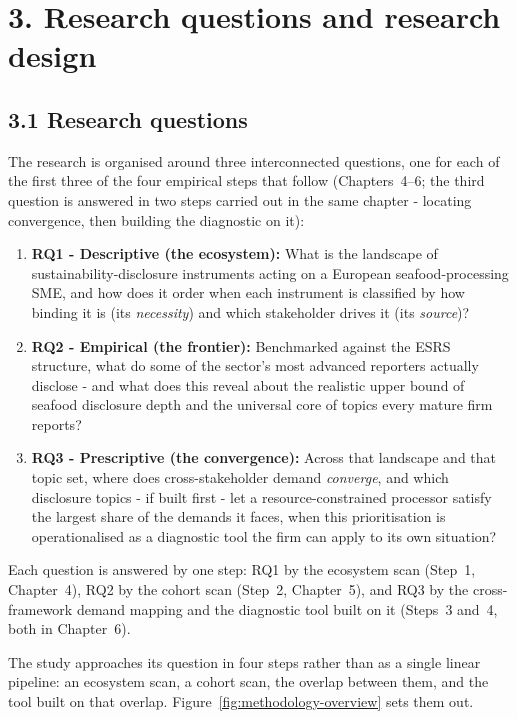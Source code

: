 \documentclass[
]{article}
\begin{document}
\section{3. Research questions and research design}\label{research-questions-and-contribution}

\subsection{3.1 Research questions}\label{research-questions}

The research is organised around three interconnected questions, one for each of
the first three of the four empirical steps that follow (Chapters~4--6; the
third question is answered in two steps carried out in the same chapter - locating convergence, then building the diagnostic on it):

\begin{enumerate}
\def\labelenumi{\arabic{enumi}.}
\item
  \textbf{RQ1 - Descriptive (the ecosystem):} What is the landscape of
  sustainability-disclosure instruments acting on a European
  seafood-processing SME, and how does it order when each instrument is
  classified by how binding it is (its \emph{necessity}) and which
  stakeholder drives it (its \emph{source})?
\item
  \textbf{RQ2 - Empirical (the frontier):} Benchmarked against the ESRS
  structure, what do some of the sector's most advanced reporters actually
  disclose - and what does this reveal about the realistic upper bound
  of seafood disclosure depth and the universal core of topics every
  mature firm reports?
\item
  \textbf{RQ3 - Prescriptive (the convergence):} Across that landscape and
  that topic set, where does cross-stakeholder demand \emph{converge}, and
  which disclosure topics - if built first - let a resource-constrained
  processor satisfy the largest share of the demands it faces, when this
  prioritisation is operationalised as a diagnostic tool the firm can
  apply to its own situation?
\end{enumerate}

Each question is answered by one step: RQ1 by the ecosystem scan (Step~1,
Chapter~4), RQ2 by the cohort scan (Step~2, Chapter~5), and RQ3 by the
cross-framework demand mapping and the diagnostic tool built on it (Steps~3
and~4, both in Chapter~6).

The study approaches its question in four steps rather than as a single linear
pipeline: an ecosystem scan, a cohort scan, the overlap between them, and the
tool built on that overlap. Figure~\ref{fig:methodology-overview} sets them out.
\end{document}
